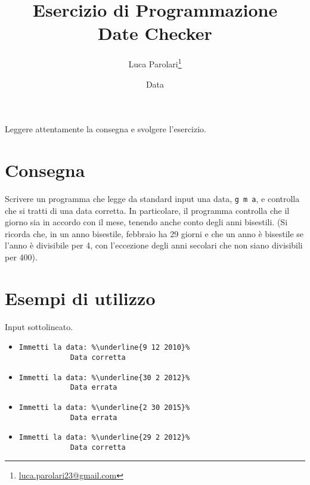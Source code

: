 \documentclass[addpoints,12pt,answers]{exam}
\author{Luca Parolari\footnote{\href{mailto:luca.parolari23@gmail.com}{luca.parolari23@gmail.com}}}
\begin{document}
    
    \title{Esercizio di Programmazione\\ \large Date Checker}
    \date{Data}
    
    \maketitle
    
    Leggere attentamente la consegna e svolgere l'esercizio.
    
    \section{Consegna}
    Scrivere un programma che legge da standard input una data,
    \texttt{g m a}, e controlla che si tratti di una data corretta. In
    particolare, il programma controlla che il giorno sia in accordo
    con il mese, tenendo anche conto degli anni bisestili. (Si ricorda
    che, in un anno bisestile, febbraio ha 29 giorni e che un anno è
    bisestile se l'anno è divisibile per 4, con l'eccezione degli anni
    secolari che non siano divisibili per 400).
    
    \section{Esempi di utilizzo}
    Input sottolineato.
    
    \begin{itemize}
    	\item 
			\begin{lstlisting}[style=verbatim]
			Immetti la data: %\underline{9 12 2010}%
			Data corretta
			\end{lstlisting}
			
		\item 
			\begin{lstlisting}[style=verbatim]
			Immetti la data: %\underline{30 2 2012}%
			Data errata
			\end{lstlisting}		
			
		\item
			\begin{lstlisting}[style=verbatim]
			Immetti la data: %\underline{2 30 2015}%
			Data errata
			\end{lstlisting}
			
		\item
			\begin{lstlisting}[style=verbatim]
			Immetti la data: %\underline{29 2 2012}%
			Data corretta
			\end{lstlisting}
    \end{itemize}
    
\end{document}
